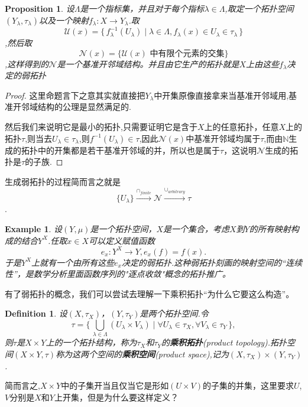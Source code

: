\documentclass{article}
\newtheorem{proposition}[theorem]{Proposition}
\newtheorem{example}[theorem]{Example}
\newtheorem{definition}[theorem]{Definition}
\newcommand*{\xfunc}[4]{{#2}\colon{#3}{#1}{#4}}
\newcommand*{\func}[3]{\xfunc{\to}{#1}{#2}{#3}}
\newcommand\Set[2]{\{\,#1\mid#2\,\}} %
\begin{document}
\begin{proposition}
设$\Lambda$是一个指标集，并且对于每个指标$\lambda \in \Lambda$,取定一个拓扑空间$(Y_\lambda,\tau_\lambda)$以及一个映射$\func{f_\lambda}{X}{Y_\lambda}$.取 \[\mathcal{U}(x)=\Set{f_{\lambda}^{-1}(U_\lambda)}{\lambda \in \Lambda,f_\lambda(x) \in U_\lambda \in \tau_\lambda}\],然后取\[\mathcal{N}(x)=\{\mathcal{U}(x)\text{ 中有限个元素的交集}\}\],这样得到的$\mathcal{N}$是一个基准开邻域结构。并且由它生产的拓扑就是$X$上由这些$f_\lambda$决定的弱拓扑
\end{proposition}

\begin{proof}
这里命题言下之意其实就直接把$Y_\lambda$中开集原像直接拿来当基准开邻域用,基准开邻域结构的公理是显然满足的.

然后我们来说明它是最小的拓扑,只需要证明它是含于$X$上的任意拓扑，任意$X$上的拓扑$\tau$,则当去$U_\lambda \in \tau_\lambda$,则$f^{-1}(U_\lambda) \in \tau$,因此$\mathcal{N}(x)$中基准开邻域均属于$\tau$,而由$\mathbb{N}$生成的拓扑中的开集都是若干基准开邻域的并，所以也是属于$\tau$，这说明$\mathcal{N}$生成的拓扑是$\tau$的子族.
\end{proof}

生成弱拓扑的过程简而言之就是\[\{U_\lambda\}\stackrel{\cap_{finite}}\longrightarrow \mathcal{N}\stackrel{\cup_{arbitrary}}\longrightarrow \tau\].


\begin{example}
设$(Y,\mu)$是一个拓扑空间，$X$是一个集合，考虑$X$到$Y$的所有映射构成的结合$Y^X$.任取$x \in X$可以定义赋值函数\[\func{e_x}{Y^{X}}{Y}, e_x(f)=f(x).\]于是$Y^{X}$上就有一个由所有这些$e_x$决定的弱拓扑.这种弱拓扑刻画的映射空间的“连续性”，是数学分析里面函数序列的"逐点收敛"概念的拓扑推广。
\end{example}

有了弱拓扑的概念，我们可以尝试去理解一下乘积拓扑“为什么它要这么构造”。


\begin{definition}
设$(X,\tau_X)$，$(Y,\tau_Y)$是两个拓扑空间.令\[\tau = \Set{\bigcup\limits_{\lambda \in \Lambda}(U_\lambda \times V_\lambda)}{\forall U_\lambda \in \tau_X, \forall V_\lambda \in \tau_Y},\]则$\tau$是$X \times Y$上的一个拓扑结构，称为$\tau_X$和$\tau_Y$的\textbf{乘积拓扑}(product topology).拓扑空间$(X \times Y,\tau)$称为这两个空间的\textbf{乘积空间}(product space),记为$(X,\tau_X) \times (Y,\tau_Y)$.
\end{definition}

简而言之,$X \times Y$中的子集开当且仅当它是形如$(U \times V)$的子集的并集，这里要求$U$,$V$分别是$X$和$Y$上开集，但是为什么要这样定义？
\end{document}

